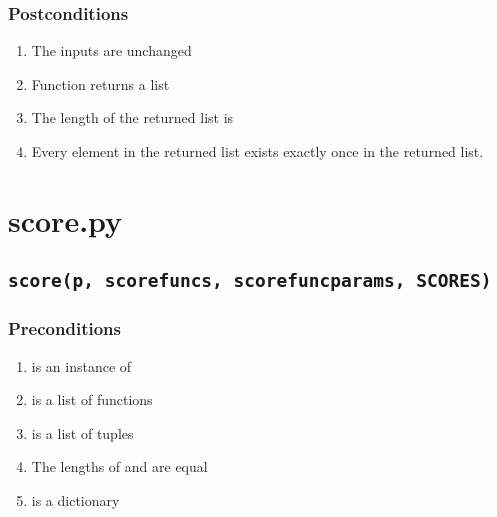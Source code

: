 \documentclass[letterpaper,10pt,english]{sphinxmanual}
\begin{document}
\subsubsection{Postconditions}
\label{contracts:id22}\begin{enumerate}
\item {} 
The inputs are unchanged

\item {} 
Function returns a list

\item {} 
The length of the returned list is 

\item {} 
Every element in the returned list exists exactly once in the returned list.

\end{enumerate}


\section{score.py}
\label{contracts:score-py}

\subsection{\texttt{score(p, scorefuncs, scorefuncparams, SCORES)}}
\label{contracts:score-p-scorefuncs-scorefuncparams-scores}

\subsubsection{Preconditions}
\label{contracts:id23}\begin{enumerate}
\item {} 
 is an instance of 

\item {} 
 is a list of functions

\item {} 
 is a list of tuples

\item {} 
The lengths of  and  are equal

\item {} 
 is a dictionary

\end{enumerate}
\end{document}
